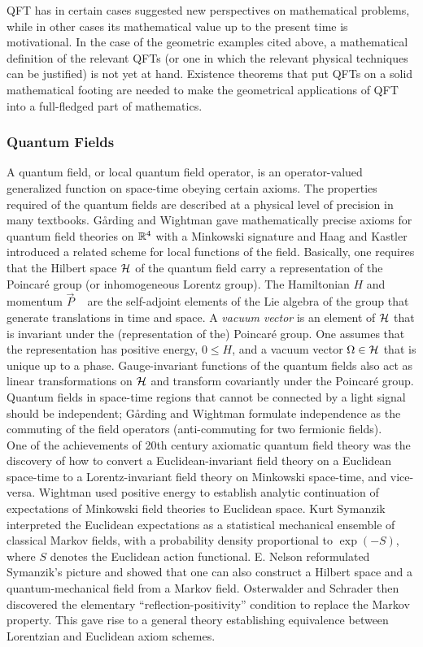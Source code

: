 QFT has in certain cases suggested new perspectives on mathematical problems,
while in other cases its mathematical value up to the present time is motivational.
In the case of the geometric examples cited above, a mathematical definition of the
relevant QFTs (or one in which the relevant physical techniques can be justified)
is not yet at hand. Existence theorems that put QFTs on a solid mathematical
footing are needed to make the geometrical applications of QFT into a full-fledged
part of mathematics.

\subsubsection{Quantum Fields}
 A quantum field, or local quantum field operator, is an operator-valued generalized function on space-time obeying certain axioms. The properties required of
 the quantum fields are described at a physical level of precision in many textbooks. Gårding and Wightman gave mathematically precise axioms
 for quantum field theories on $\mathbb{R}^4$ with a Minkowski signature and Haag
 and Kastler introduced a related scheme for local functions of the field.
 Basically, one requires that the Hilbert space $\mathcal{H}$ of the quantum field carry a representation of the Poincaré group (or inhomogeneous Lorentz group). The Hamiltonian $H$ and momentum $\vec{P}$ ~ are the self-adjoint elements of the Lie algebra of the
 group that generate translations in time and space. A \emph{vacuum vector} is an element of $\mathcal{H}$ that is invariant under the (representation of the) Poincaré group. One
 assumes that the representation has positive energy, $0 \leq H$, and a vacuum vector
 $\Omega \in \mathcal{H}$ that is unique up to a phase. Gauge-invariant functions of the quantum
 fields also act as linear transformations on $\mathcal{H}$ and transform covariantly under the
 Poincaré group. Quantum fields in space-time regions that cannot be connected by
 a light signal should be independent; Gårding and Wightman formulate independence as the commuting of the field operators (anti-commuting for two fermionic
 fields).\\
 One of the achievements of 20th century axiomatic quantum field theory was the
 discovery of how to convert a Euclidean-invariant field theory on a Euclidean space-time to a Lorentz-invariant field theory on Minkowski space-time, and vice-versa.
Wightman used positive energy to establish analytic continuation of expectations
of Minkowski field theories to Euclidean space. Kurt Symanzik interpreted the
Euclidean expectations as a statistical mechanical ensemble of classical Markov
fields, with a probability density proportional to $\exp(−S)$, where $S$ denotes
the Euclidean action functional. E. Nelson reformulated Symanzik’s picture and
showed that one can also construct a Hilbert space and a quantum-mechanical field
from a Markov field. Osterwalder and Schrader then discovered the elementary
“reflection-positivity” condition to replace the Markov property. This gave rise to
a general theory establishing equivalence between Lorentzian and Euclidean axiom
schemes. 
